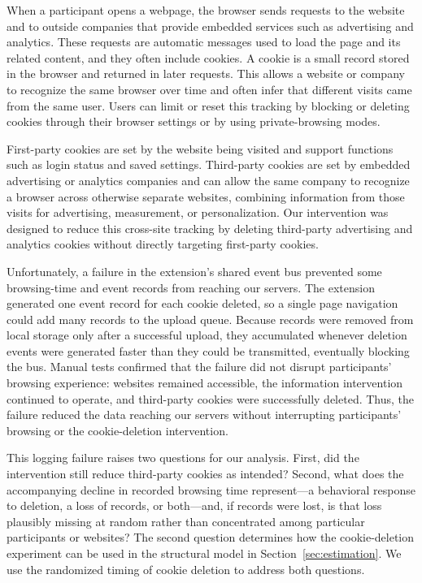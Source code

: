 \documentclass[12pt]{article}
\theoremstyle{definition}
\theoremstyle{remark}
\begin{document}
\begin{appendix}
When a participant opens a webpage, the browser sends requests to the website and to outside companies that provide embedded services such as advertising and analytics. These requests are automatic messages used to load the page and its related content, and they often include cookies. A cookie is a small record stored in the browser and returned in later requests. This allows a website or company to recognize the same browser over time and often infer that different visits came from the same user. Users can limit or reset this tracking by blocking or deleting cookies through their browser settings or by using private-browsing modes.

First-party cookies are set by the website being visited and support functions such as login status and saved settings. Third-party cookies are set by embedded advertising or analytics companies and can allow the same company to recognize a browser across otherwise separate websites, combining information from those visits for advertising, measurement, or personalization. Our intervention was designed to reduce this cross-site tracking by deleting third-party advertising and analytics cookies without directly targeting first-party cookies.

Unfortunately, a failure in the extension's shared event bus prevented some browsing-time and event records from reaching our servers. The extension generated one event record for each cookie deleted, so a single page navigation could add many records to the upload queue. Because records were removed from local storage only after a successful upload, they accumulated whenever deletion events were generated faster than they could be transmitted, eventually blocking the bus. Manual tests confirmed that the failure did not disrupt participants' browsing experience: websites remained accessible, the information intervention continued to operate, and third-party cookies were successfully deleted. Thus, the failure reduced the data reaching our servers without interrupting participants' browsing or the cookie-deletion intervention.

This logging failure raises two questions for our analysis. First, did the intervention still reduce third-party cookies as intended? Second, what does the accompanying decline in recorded browsing time represent---a behavioral response to deletion, a loss of records, or both---and, if records were lost, is that loss plausibly missing at random rather than concentrated among particular participants or websites? The second question determines how the cookie-deletion experiment can be used in the structural model in Section~\ref{sec:estimation}. We use the randomized timing of cookie deletion to address both questions.


\end{appendix}
\end{document}
